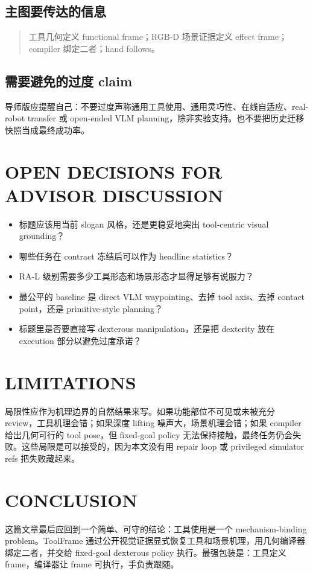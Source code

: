 \documentclass[letterpaper, 10 pt, conference]{ieeeconf}
\newcommand{\method}{ToolFrame}
\begin{document}
\subsection{主图要传达的信息}
\begin{quote}
工具几何定义 functional frame；RGB-D 场景证据定义 effect frame；compiler 绑定二者；hand follows。
\end{quote}

\subsection{需要避免的过度 claim}
导师版应提醒自己：不要过度声称通用工具使用、通用灵巧性、在线自适应、real-robot transfer 或 open-ended VLM planning，除非实验支持。也不要把历史迁移快照当成最终成功率。

\section{OPEN DECISIONS FOR ADVISOR DISCUSSION}

\begin{itemize}
  \item 标题应该用当前 slogan 风格，还是更稳妥地突出 tool-centric visual grounding？
  \item 哪些任务在 contract 冻结后可以作为 headline statistics？
  \item RA-L 级别需要多少工具形态和场景形态才显得足够有说服力？
  \item 最公平的 baseline 是 direct VLM waypointing、去掉 tool axis、去掉 contact point，还是 primitive-style planning？
  \item 标题里是否要直接写 dexterous manipulation，还是把 dexterity 放在 execution 部分以避免过度承诺？
\end{itemize}

\section{LIMITATIONS}

局限性应作为机理边界的自然结果来写。如果功能部位不可见或未被充分 review，工具机理会错；如果深度 lifting 噪声大，场景机理会错；如果 compiler 给出几何可行的 tool pose，但 fixed-goal policy 无法保持接触，最终任务仍会失败。这些局限是可以接受的，因为本文没有用 repair loop 或 privileged simulator refs 把失败藏起来。

\section{CONCLUSION}

这篇文章最后应回到一个简单、可守的结论：工具使用是一个 mechanism-binding problem。\method{} 通过公开视觉证据显式恢复工具和场景机理，用几何编译器绑定二者，并交给 fixed-goal dexterous policy 执行。最强包装是：工具定义 frame，编译器让 frame 可执行，手负责跟随。



\end{document}
